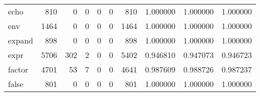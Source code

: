 \begin{longtable}{lrrrrrrrrr}
echo      &                                 810 &                                               0 &                                              0 &                                             0 &                                              0 &                                          810 &                                           1.000000 &                               1.000000 &                             1.000000 \\
env       &                                1464 &                                               0 &                                              0 &                                             0 &                                              0 &                                         1464 &                                           1.000000 &                               1.000000 &                             1.000000 \\
expand    &                                 898 &                                               0 &                                              0 &                                             0 &                                              0 &                                          898 &                                           1.000000 &                               1.000000 &                             1.000000 \\
expr      &                                5706 &                                             302 &                                              2 &                                             0 &                                              0 &                                         5402 &                                           0.946810 &                               0.947073 &                             0.946723 \\
factor    &                                4701 &                                              53 &                                              7 &                                             0 &                                              0 &                                         4641 &                                           0.987609 &                               0.988726 &                             0.987237 \\
false     &                                 801 &                                               0 &                                              0 &                                             0 &                                              0 &                                          801 &                                           1.000000 &                               1.000000 &                             1.000000 \\

\end{longtable}
